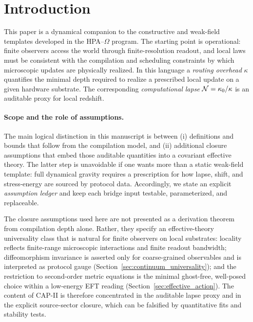 \section{Introduction}
\label{sec:introduction}

This paper is a dynamical companion to the constructive and weak-field templates developed in the HPA--$\Omega$ program.
The starting point is operational: finite observers access the world through finite-resolution readout, and local laws must be consistent with the compilation and scheduling constraints by which microscopic updates are physically realized.
In this language a \emph{routing overhead} $\kappa$ quantifies the minimal depth required to realize a prescribed local update on a given hardware substrate.
The corresponding \emph{computational lapse} $\mathcal{N}=\kappa_0/\kappa$ is an auditable proxy for local redshift.

\paragraph{Scope and the role of assumptions.}
The main logical distinction in this manuscript is between (i) definitions and bounds that follow from the compilation model, and (ii) additional closure assumptions that embed those auditable quantities into a covariant effective theory.
The latter step is unavoidable if one wants more than a static weak-field template: full dynamical gravity requires a prescription for how lapse, shift, and stress-energy are sourced by protocol data.
Accordingly, we state an explicit \emph{assumption ledger} and keep each bridge input testable, parameterized, and replaceable.
\par
\noindent The closure assumptions used here are not presented as a derivation theorem from compilation depth alone.
Rather, they specify an effective-theory universality class that is natural for finite observers on local substrates:
locality reflects finite-range microscopic interactions and finite readout bandwidth; diffeomorphism invariance is asserted only for coarse-grained observables and is interpreted as protocol gauge (Section~\ref{sec:continuum_universality}); and the restriction to second-order metric equations is the minimal ghost-free, well-posed choice within a low-energy EFT reading (Section~\ref{sec:effective_action}).
The content of CAP-II is therefore concentrated in the auditable lapse proxy and in the explicit source-sector closure, which can be falsified by quantitative fits and stability tests.

